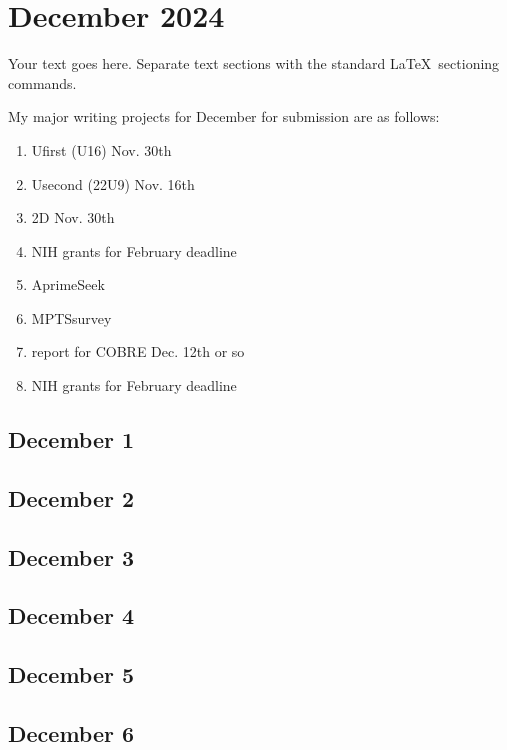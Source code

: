 %
%
%

\chapter{December 2024}
\label{intro} %

Your text goes here. Separate text sections with the standard \LaTeX\
sectioning commands.


My major writing projects for December for submission are as follows:
\begin{enumerate}
	\item Ufirst (U16) Nov. 30th
	\item Usecond (22U9) Nov. 16th
	\item 2D Nov. 30th
	\item NIH grants for February deadline
\item AprimeSeek
\item MPTSsurvey
\item report for COBRE Dec. 12th or so
\item NIH grants for February deadline
\end{enumerate}


\section{December 1}

\section{December 2}

\section{December 3}

\section{December 4}

\section{December 5}

\section{December 6}

